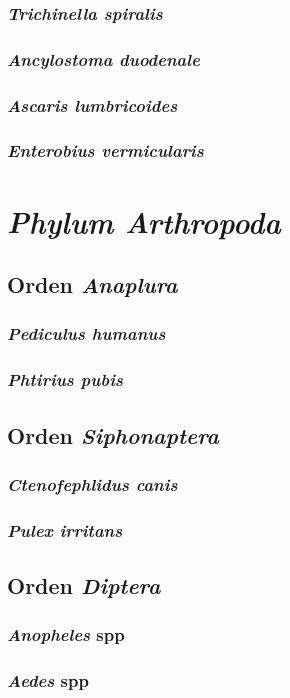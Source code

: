 \documentclass[10pt,a4paper,onecolumn,openany]{book}
\begin{document}
\subsection{\textit{Trichinella spiralis}}
\subsection{\textit{Ancylostoma duodenale}}
\subsection{\textit{Ascaris lumbricoides}}
\subsection{\textit{Enterobius vermicularis}}
\chapter{\textit{Phylum Arthropoda}}
\section{Orden \textit{Anaplura}}
\subsection{\textit{Pediculus humanus}}
\subsection{\textit{Phtirius pubis}}
\section{Orden \textit{Siphonaptera}}
\subsection{\textit{Ctenofephlidus canis}}
\subsection{\textit{Pulex irritans}}
\section{Orden \textit{Diptera}}
\subsection{\textit{Anopheles} spp}
\subsection{\textit{Aedes} spp}
\end{document}
